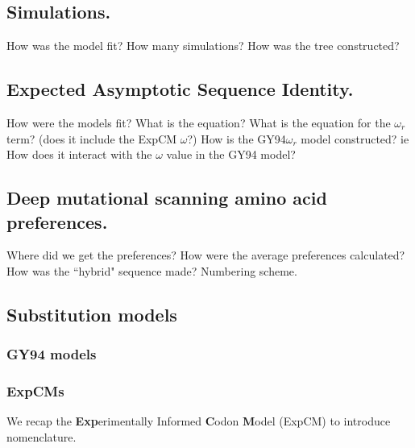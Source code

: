 \documentclass[11pt]{article}
\begin{document}
\subsection*{Simulations.}
How was the model fit? 
How many simulations? 
How was the tree constructed? 

\subsection*{Expected Asymptotic Sequence Identity.}
How were the models fit? 
What is the equation? 
What is the equation for the $\omega_r$ term? (does it include the ExpCM $\omega$?)
How is the GY94$\omega_r$ model constructed? ie How does it interact with the $\omega$ value in the GY94 model? 

\subsection*{Deep mutational scanning amino acid preferences.}
Where did we get the preferences? 
How were the average preferences calculated? 
How was the ``hybrid" sequence made? 
Numbering scheme. 

\subsection*{Substitution models}
\subsubsection*{GY94 models}
\subsubsection*{ExpCMs}
We recap the \textbf{Exp}erimentally Informed \textbf{C}odon \textbf{M}odel (ExpCM) \citep{bloom2014experimentally,bloom2014informed,bloom2017identification,hilton2017phydms} to introduce nomenclature. 
\end{document}
